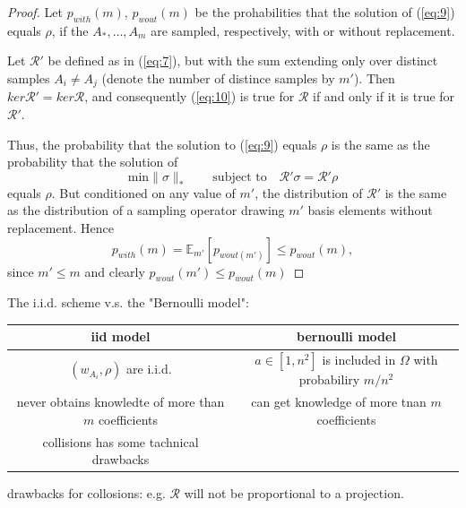 \documentclass{article}
\begin{document}
\begin{proof}
Let $p_{with}(m)$, $p_{wout}(m)$ be the prohabilities that the solution of (\ref{eq:9}) equals $\rho$, if the $A_*, \dots, A_m$ are sampled, respectively, with or without replacement.



Let $\mathcal{R}'$ be defined as in (\ref{eq:7}), but with the sum extending only over distinct samples $A_i \neq A_j$ (denote the number of distince samples by $m'$). Then {\color{red} $ker \mathcal{R}' = ker\mathcal{R}$}, and consequently (\ref{eq:10}) is true for $\mathcal{R}$ if and only if it is true for $\mathcal{R}'$.


Thus, the probability that the solution to (\ref{eq:9}) equals $\rho$ is the same as the probability that the solution of 
\begin{equation}
\text{min} \|\sigma\|_* \qquad \text{subject to} \quad \mathcal{R}'\sigma = \mathcal{R}'\rho
\end{equation}
equals $\rho$. {\color{red}But conditioned on any value of $m'$, the distribution of $\mathcal{R}'$ is the same as the distribution of a sampling operator drawing $m'$ basis elements without replacement. Hence
\begin{equation}
p_{with}(m) = \mathbb{E}_{m'}[p_{wout(m')}]\le p_{wout}(m),
\end{equation}
since $m'\le m$ and clearly $p_{wout}(m')\le p_{wout}(m)$}
\end{proof}

The i.i.d. scheme v.s. the "Bernoulli model":

\begin{tabular}{|c|c|}
\hline 
iid model & bernoulli model  \\
\hline 
$(w_{A_i},\rho)$ are i.i.d. & $a\in[1,n^2]$ is included in $\Omega$ with probabiliry $m/n^2$ \\ 
\hline 
never obtains knowledte of more than $m$ coefficients & can get knowledge of more tnan $m$ coefficients  \\ 
\hline 
collisions has some tachnical drawbacks  & \\
\hline
\end{tabular} 

drawbacks for collosions: e.g. $\mathcal{R}$ will not be proportional to a projection.
\end{document}
